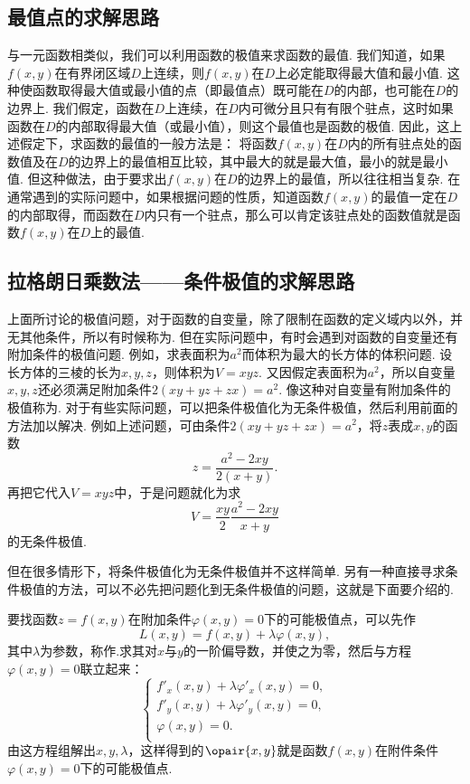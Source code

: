 \subsection{最值点的求解思路}
与一元函数相类似，我们可以利用函数的极值来求函数的最值.
我们知道，如果\(f(x,y)\)在有界闭区域\(D\)上连续，则\(f(x,y)\)在\(D\)上必定能取得最大值和最小值.
这种使函数取得最大值或最小值的点（即最值点）既可能在\(D\)的内部，也可能在\(D\)的边界上.
我们假定，函数在\(D\)上连续，在\(D\)内可微分且只有有限个驻点，这时如果函数在\(D\)的内部取得最大值（或最小值），则这个最值也是函数的极值.
因此，这上述假定下，求函数的最值的一般方法是：
将函数\(f(x,y)\)在\(D\)内的所有驻点处的函数值及在\(D\)的边界上的最值相互比较，其中最大的就是最大值，最小的就是最小值.
但这种做法，由于要求出\(f(x,y)\)在\(D\)的边界上的最值，所以往往相当复杂.
在通常遇到的实际问题中，如果根据问题的性质，知道函数\(f(x,y)\)的最值一定在\(D\)的内部取得，而函数在\(D\)内只有一个驻点，那么可以肯定该驻点处的函数值就是函数\(f(x,y)\)在\(D\)上的最值.

\subsection{拉格朗日乘数法——条件极值的求解思路}\label{subsection:多元函数微分法.拉格朗日乘数法}
上面所讨论的极值问题，对于函数的自变量，除了限制在函数的定义域内以外，并无其他条件，所以有时候称为.
但在实际问题中，有时会遇到对函数的自变量还有附加条件的极值问题.
例如，求表面积为\(a^2\)而体积为最大的长方体的体积问题.
设长方体的三棱的长为\(x,y,z\)，则体积为\(V = xyz\).
又因假定表面积为\(a^2\)，所以自变量\(x,y,z\)还必须满足附加条件\(2(xy+yz+zx)=a^2\).
像这种对自变量有附加条件的极值称为.
对于有些实际问题，可以把条件极值化为无条件极值，然后利用前面的方法加以解决.
例如上述问题，可由条件\(2(xy+yz+zx)=a^2\)，将\(z\)表成\(x,y\)的函数\[
z = \frac{a^2-2xy}{2(x+y)}.
\]再把它代入\(V = xyz\)中，于是问题就化为求\[
V = \frac{xy}{2} \frac{a^2-2xy}{x+y}
\]的无条件极值.

但在很多情形下，将条件极值化为无条件极值并不这样简单.
另有一种直接寻求条件极值的方法，可以不必先把问题化到无条件极值的问题，这就是下面要介绍的.

要找函数\(z=f(x,y)\)在附加条件\(\varphi(x,y)=0\)下的可能极值点，可以先作\[
L(x,y) = f(x,y)+\lambda \varphi(x,y),
\]其中\(\lambda\)为参数，称作.求其对\(x\)与\(y\)的一阶偏导数，并使之为零，然后与方程\(\varphi(x,y)=0\)联立起来：\[
\left\{ \begin{array}{l}
f'_x(x,y)+\lambda\varphi'_x(x,y)=0, \\
f'_y(x,y)+\lambda\varphi'_y(x,y)=0, \\
\varphi(x,y)=0. \\
\end{array} \right.
\]由这方程组解出\(x,y,\lambda\)，这样得到的\(\opair{x,y}\)就是函数\(f(x,y)\)在附件条件\(\varphi(x,y)=0\)下的可能极值点.

